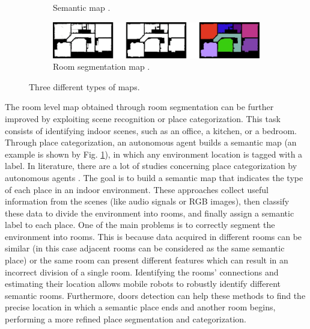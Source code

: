 \begin{figure}[h!]
\begin{subfigure}[b]{0.45\linewidth}
		\caption{Semantic map \cite{placecategorization}.}
		\label{fig:semantic_map}
	\end{subfigure}
	\newline
	\newline
	\begin{subfigure}[b]{0.99\linewidth}
		\centering
		\includegraphics[width=\textwidth]{images/roomsegmentation.png}
		\caption{Room segmentation map \cite{segmentation3d}.}
		\label{fig:room_segmentation_map}
	\end{subfigure}
	\caption{Three different types of maps.}
	
\end{figure}

The room level map obtained through room segmentation can be further improved by exploiting scene recognition or place categorization. This task consists of identifying indoor scenes, such as an office, a kitchen, or a bedroom. Through place categorization, an autonomous agent builds a semantic map (an example is shown by Fig. \ref{fig:semantic_map}), in which any environment location is tagged with a label. In literature, there are a lot of studies concerning place categorization by autonomous agents \cite{scenerecognitionaudio, scenerecognitiononjectdetection, placecategorization, placecategorizationlargescale}. The goal is to build a semantic map that indicates the type of each place in an indoor environment. These approaches collect useful information from the scenes (like audio signals or RGB images), then classify these data to divide the environment into rooms, and finally assign a semantic label to each place. One of the main problems is to correctly segment the environment into rooms. This is because data acquired in different rooms can be similar (in this case adjacent rooms can be considered as the same semantic place) or the same room can present different features which can result in an incorrect division of a single room. Identifying the rooms' connections and estimating their location allows mobile robots
to robustly identify different semantic rooms. Furthermore, doors detection can help these methods to find the precise location in which a semantic place ends and another room begins, performing a more refined place segmentation and categorization.  

